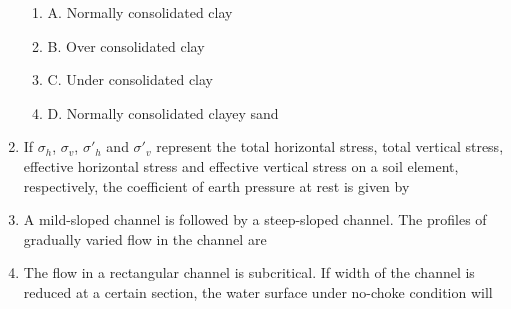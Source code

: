 \documentclass[journal,12pt,onecolumn]{IEEEtran}
\theoremstyle{remark}
\begin{document}
\begin{enumerate}
\begin{enumerate}[label=]
\item A. Normally consolidated clay \\
\item B. Over consolidated clay \\
\item C. Under consolidated clay \\
\item D. Normally consolidated clayey sand
\end{enumerate}

\setlength{\parindent}{0pt}
\setlength{\parskip}{0.5cm}

\raggedright


\noindent\item If $\sigma_h$, $\sigma_v$, $\sigma'_h$ and $\sigma'_v$ represent the total horizontal stress, total vertical stress, effective horizontal stress and effective vertical stress on a soil element, respectively, the coefficient of earth pressure at rest is given by
\hfill{}
\begin{enumerate}
\end{enumerate}
\noindent\item A mild-sloped channel is followed by a steep-sloped channel. The profiles of gradually varied flow in the channel are
\hfill{}
\begin{enumerate}
\end{enumerate}
\noindent\item The flow in a rectangular channel is subcritical. If width of the channel is reduced at a certain section, the water surface under no-choke condition will

\end{enumerate}
\end{document}
